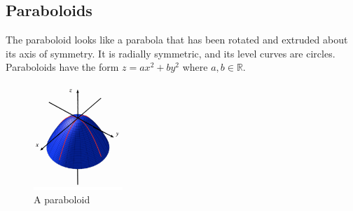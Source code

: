 \subsection{Paraboloids}
\noindent
The paraboloid looks like a parabola that has been rotated and extruded about its axis of symmetry.
It is radially symmetric, and its level curves are circles.
Paraboloids have the form $z = ax^2 + by^2$ where $a,b \in \mathbb{R}$.

\begin{figure}[H]
	\centering
	\includegraphics[width = 0.3\textwidth]{./differentialMultivariableCalculus/paraboloid.png}
	\caption{A paraboloid}
\end{figure}